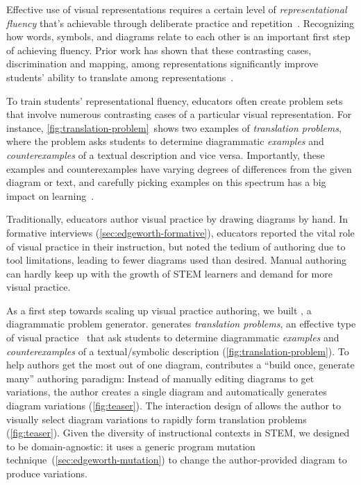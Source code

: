 Effective use of visual representations requires a certain level of \emph{representational fluency} that's achievable through deliberate practice and repetition~\cite{disessa_meta-representation_2000, representationalFluency}. Recognizing how words, symbols, and diagrams relate to each other is an important first step of achieving fluency. Prior work has shown that these contrasting cases, \ie  discrimination and mapping, among representations significantly improve students' ability to translate among representations~\cite{kellman_perceptual_2013}.

To train students' representational fluency, educators often create problem sets that involve numerous contrasting cases of a particular visual representation. For instance, \cref{fig:translation-problem}~shows two examples of \emph{translation problems}, where the problem asks students to determine diagrammatic \emph{examples} and \emph{counterexamples} of a textual description and vice versa. Importantly, these examples and counterexamples have varying degrees of differences from the given diagram or text, and carefully picking examples on this spectrum has a big impact on learning~\cite{marton_sameness_2006}.

Traditionally, educators author visual practice by drawing diagrams by hand. In formative interviews (\cref{sec:edgeworth-formative}), educators reported the vital role of visual practice in their instruction, but noted the tedium of authoring due to tool limitations, leading to fewer diagrams used than desired. Manual authoring can hardly keep up with the growth of STEM learners and demand for more visual practice.

As a first step towards scaling up visual practice authoring, we built \Edgeworth, a diagrammatic problem generator. \Edgeworth generates \emph{translation problems}, an effective type of visual practice~\cite{kellman_perceptual_2013} that ask students to determine diagrammatic \emph{examples} and \emph{counterexamples} of a textual/symbolic description (\cref{fig:translation-problem}). To help authors get the most out of one diagram, \Edgeworth contributes a ``build once, generate many'' authoring paradigm: Instead of manually editing diagrams to get variations, the author creates a single diagram and \Edgeworth automatically generates diagram variations (\cref{fig:teaser}). The interaction design of \Edgeworth allows the author to visually select diagram variations to rapidly form translation problems (\cref{fig:teaser}). Given the diversity of instructional contexts in STEM, we designed \Edgeworth to be domain-agnostic: it uses a generic program mutation technique~(\cref{sec:edgeworth-mutation}) to change the author-provided diagram to produce variations. 

